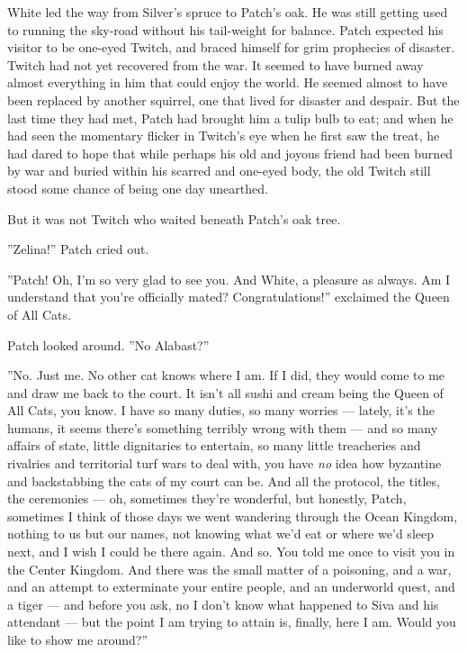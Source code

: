 \documentclass[12pt]{book}
\begin{document}
White led the way from Silver's spruce to Patch's oak. He was still
getting used to running the sky-road without his tail-weight for
balance. Patch expected his visitor to be one-eyed Twitch, and braced
himself for grim prophecies of disaster. Twitch had not yet recovered
from the war. It seemed to have burned away almost everything in him
that could enjoy the world. He seemed almost to have been replaced by
another squirrel, one that lived for disaster and despair. But the
last time they had met, Patch had brought him a tulip bulb to eat; and
when he had seen the momentary flicker in Twitch's eye when he first
saw the treat, he had dared to hope that while perhaps his old and
joyous friend had been burned by war and buried within his scarred and
one-eyed body, the old Twitch still stood some chance of being one day
unearthed.

But it was not Twitch who waited beneath Patch's oak tree.

''Zelina!'' Patch cried out.

''Patch! Oh, I'm so very glad to see you. And White, a pleasure as
always. Am I understand that you're officially mated?
Congratulations!'' exclaimed the Queen of All Cats.

Patch looked around. ''No Alabast?''

''No. Just me. No other cat knows where I am. If I did, they would
come to me and draw me back to the court. It isn't all sushi and cream
being the Queen of All Cats, you know. I have so many duties, so many
worries --- lately, it's the humans, it seems there's something
terribly wrong with them --- and so many affairs of state, little
dignitaries to entertain, so many little treacheries and rivalries and
territorial turf wars to deal with, you have \textit{no} idea how
byzantine and backstabbing the cats of my court can be. And all the
protocol, the titles, the ceremonies --- oh, sometimes they're
wonderful, but honestly, Patch, sometimes I think of those days we
went wandering through the Ocean Kingdom, nothing to us but our names,
not knowing what we'd eat or where we'd sleep next, and I wish I could
be there again. And so. You told me once to visit you in the Center
Kingdom. And there was the small matter of a poisoning, and a war, and
an attempt to exterminate your entire people, and an underworld quest,
and a tiger --- and before you ask, no I don't know what happened to
Siva and his attendant --- but the point I am trying to attain is,
finally, here I am. Would you like to show me around?''
\end{document}
